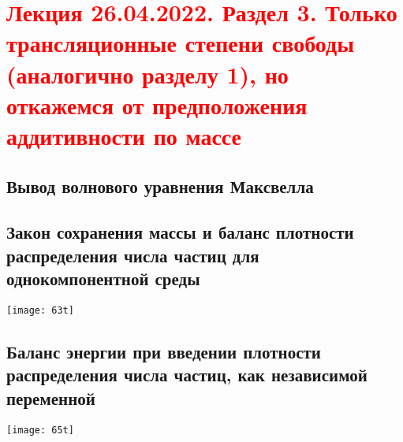 \documentclass[main.tex]{subfiles}
\begin{document}
\section{\textcolor{red}{Лекция 26.04.2022. Раздел 3. Только трансляционные степени свободы (аналогично разделу 1), но откажемся от предположения аддитивности по массе}}

\subsection{Вывод волнового уравнения Максвелла}

\subsection{Закон сохранения массы и баланс плотности распределения числа частиц для однокомпонентной среды}
\texttt{[image: 63t]}


\subsection{Баланс энергии при введении плотности распределения числа частиц, как независимой переменной}
\texttt{[image: 65t]}

\end{document}
